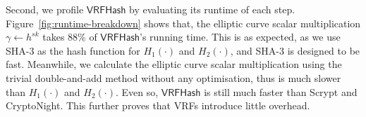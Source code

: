 Second, we profile $\mathsf{VRFHash}$ by evaluating its runtime of each step.
Figure~\ref{fig:runtime-breakdown} shows that, the elliptic curve scalar multiplication $\gamma \gets h^{sk}$ takes 88\% of $\mathsf{VRFHash}$'s running time.
This is as expected, as we use SHA-3 as the hash function for $H_1(\cdot)$ and $H_2(\cdot)$, and SHA-3 is designed to be fast.
Meanwhile, we calculate the elliptic curve scalar multiplication using the trivial double-and-add method without any optimisation, thus is much slower than $H_1(\cdot)$ and $H_2(\cdot)$.
Even so, $\mathsf{VRFHash}$ is still much faster than Scrypt and CryptoNight.
This further proves that VRFs introduce little overhead.
